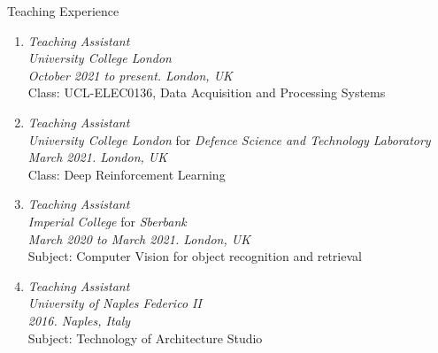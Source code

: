 \begin{rSection}{Teaching Experience}
\begin{enumerate}[leftmargin=0.45cm, itemsep=0.4em, topsep=0.5em, parsep=0.2em]
    \item
    \emph{Teaching Assistant} \\
    \emph{University College London} \\
    \textit{October 2021 to \emph{present}. London, UK}  \\
    Class: UCL-ELEC0136, Data Acquisition and Processing Systems

    \item
    \emph{Teaching Assistant} \\
    \emph{University College London} for \emph{Defence Science and Technology Laboratory} \\
    \textit{March 2021. London, UK} \\
    Class: Deep Reinforcement Learning

    \item
    \emph{Teaching Assistant} \\
    \emph{Imperial College} for \emph{Sberbank} \\
    \textit{March 2020 to March 2021. London, UK} \\
    Subject: Computer Vision for object recognition and retrieval

    \item
    \emph{Teaching Assistant} \\
    \emph{University of Naples Federico II} \\
    \textit{2016. Naples, Italy} \\
    Subject: Technology of Architecture Studio
\end{enumerate}
\end{rSection}